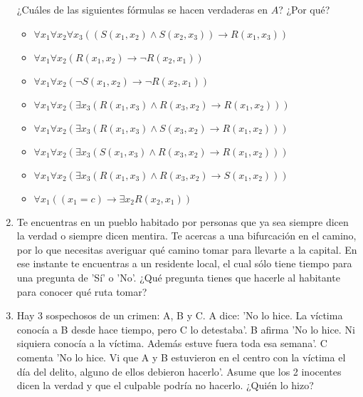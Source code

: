 \documentclass[11pt,answers]{exam}
\begin{document}
\begin{enumerate}
    ¿Cuáles de las siguientes fórmulas se hacen verdaderas en $A$? ¿Por qué?
    \begin{itemize}
        \item $\forall x_1 \forall x_2 \forall x_3 ((S(x_1, x_2) \land S(x_2, x_3)) \to R(x_1, x_3))$
        \item $\forall x_1 \forall x_2 (R(x_1, x_2) \to \neg R(x_2, x_1))$
        \item $\forall x_1 \forall x_2 (\neg S(x_1, x_2) \to \neg R(x_2, x_1))$
        \item $\forall x_1 \forall x_2 (\exists x_3 (R(x_1, x_3) \land R(x_3, x_2) \to R(x_1, x_2)))$
        \item $\forall x_1 \forall x_2 (\exists x_3 (R(x_1, x_3) \land S(x_3, x_2) \to R(x_1, x_2)))$
        \item $\forall x_1 \forall x_2 (\exists x_3 (S(x_1, x_3) \land R(x_3, x_2) \to R(x_1, x_2)))$
        \item $\forall x_1 \forall x_2 (\exists x_3 (R(x_1, x_3) \land R(x_3, x_2) \to S(x_1, x_2)))$
        \item $\forall x_1 ((x_1 = c) \to \exists x_2 R(x_2, x_1))$
    \end{itemize}
    
    
    \item Te encuentras en un pueblo habitado por personas que ya sea siempre dicen la verdad o siempre dicen mentira. Te acercas a una bifurcación en el camino, por lo que necesitas averiguar qué camino tomar para llevarte a la capital. En ese instante te encuentras a un residente local, el cual sólo tiene tiempo para una pregunta de 'Sí' o 'No'. ¿Qué pregunta tienes que hacerle al habitante para conocer qué ruta tomar?

    

    \item Hay 3 sospechosos de un crimen: A, B y C. A dice: 'No lo hice. La víctima conocía a B desde hace tiempo, pero C lo detestaba'. B afirma 'No lo hice. Ni siquiera conocía a la víctima. Además estuve fuera toda esa semana'. C comenta 'No lo hice. Vi que A y B estuvieron en el centro con la víctima el día del delito, alguno de ellos debieron hacerlo'. Asume que los 2 inocentes dicen la verdad y que el culpable podría no hacerlo. ¿Quién lo hizo?
    


\end{enumerate}
\end{document}
